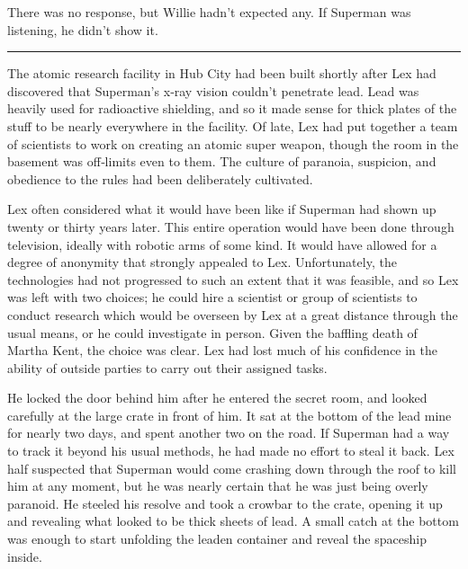 There was no response, but Willie hadn't expected any. If Superman was
listening, he didn't show it.

\begin{center}\rule{0.5\linewidth}{\linethickness}\end{center}

The atomic research facility in Hub City had been built shortly after
Lex had discovered that Superman's x‐ray vision couldn't penetrate lead.
Lead was heavily used for radioactive shielding, and so it made sense
for thick plates of the stuff to be nearly everywhere in the facility.
Of late, Lex had put together a team of scientists to work on creating
an atomic super weapon, though the room in the basement was off‐limits
even to them. The culture of paranoia, suspicion, and obedience to the
rules had been deliberately cultivated.

Lex often considered what it would have been like if Superman had shown
up twenty or thirty years later. This entire operation would have been
done through television, ideally with robotic arms of some kind. It
would have allowed for a degree of anonymity that strongly appealed to
Lex. Unfortunately, the technologies had not progressed to such an
extent that it was feasible, and so Lex was left with two choices; he
could hire a scientist or group of scientists to conduct research which
would be overseen by Lex at a great distance through the usual means, or
he could investigate in person. Given the baffling death of Martha Kent,
the choice was clear. Lex had lost much of his confidence in the ability
of outside parties to carry out their assigned tasks.

He locked the door behind him after he entered the secret room, and
looked carefully at the large crate in front of him. It sat at the
bottom of the lead mine for nearly two days, and spent another two on
the road. If Superman had a way to track it beyond his usual methods, he
had made no effort to steal it back. Lex half suspected that Superman
would come crashing down through the roof to kill him at any moment, but
he was nearly certain that he was just being overly paranoid. He steeled
his resolve and took a crowbar to the crate, opening it up and revealing
what looked to be thick sheets of lead. A small catch at the bottom was
enough to start unfolding the leaden container and reveal the spaceship
inside.

